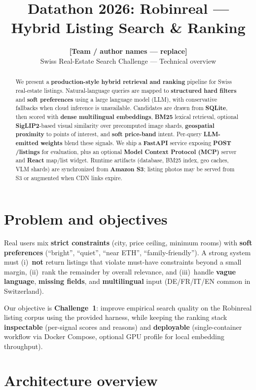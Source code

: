 \documentclass[11pt]{article}
\title{\vspace{-1.2cm}\textbf{Datathon 2026: Robinreal --- Hybrid Listing Search \& Ranking}\vspace{-0.15cm}}
\author{\textbf{[Team / author names --- replace]}\\[0.25em]\small Swiss Real-Estate Search Challenge --- Technical overview}
\date{}
\begin{document}
\maketitle

\begin{abstract}
\noindent
We present a \textbf{production-style hybrid retrieval and ranking} pipeline for Swiss real-estate listings. Natural-language queries are mapped to \textbf{structured hard filters} and \textbf{soft preferences} using a large language model (LLM), with conservative fallbacks when cloud inference is unavailable. Candidates are drawn from \textbf{SQLite}, then scored with \textbf{dense multilingual embeddings}, \textbf{BM25} lexical retrieval, optional \textbf{SigLIP2}-based visual similarity over precomputed image shards, \textbf{geospatial proximity} to points of interest, and \textbf{soft price-band} intent. Per-query \textbf{LLM-emitted weights} blend these signals. We ship a \textbf{FastAPI} service exposing \textbf{POST /listings} for evaluation, plus an optional \textbf{Model Context Protocol (MCP)} server and \textbf{React} map/list widget. Runtime artifacts (database, BM25 index, geo caches, VLM shards) are synchronized from \textbf{Amazon S3}; listing photos may be served from S3 or augmented when CDN links expire.
\end{abstract}

\section{Problem and objectives}

Real users mix \textbf{strict constraints} (city, price ceiling, minimum rooms) with \textbf{soft preferences} (``bright'', ``quiet'', ``near ETH'', ``family-friendly''). A strong system must (i)~\textbf{not} return listings that violate must-have constraints beyond a small margin, (ii)~rank the remainder by overall relevance, and (iii)~handle \textbf{vague language}, \textbf{missing fields}, and \textbf{multilingual} input (DE/FR/IT/EN common in Switzerland).

Our objective is \textbf{Challenge~1}: improve empirical search quality on the Robinreal listing corpus using the provided harness, while keeping the ranking stack \textbf{inspectable} (per-signal scores and reasons) and \textbf{deployable} (single-container workflow via Docker Compose, optional GPU profile for local embedding throughput).

\section{Architecture overview}
\end{document}
